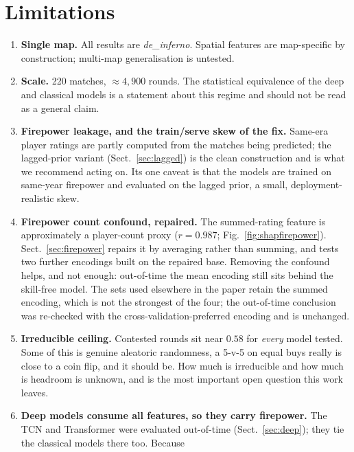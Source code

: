 \documentclass[11pt,a4paper]{article}
\begin{document}
\section{Limitations}
\label{sec:limitations}

\begin{enumerate}
  \item \textbf{Single map.} All results are \textit{de\_inferno}. Spatial features are
    map-specific by construction; multi-map generalisation is untested.
  \item \textbf{Scale.} 220 matches, $\approx 4{,}900$ rounds. The statistical equivalence of the
    deep and classical models is a statement about this regime and should not be read as a general
    claim.
  \item \textbf{Firepower leakage, and the train/serve skew of the fix.} Same-era player ratings are
    partly computed from the matches being predicted; the lagged-prior variant (Sect.~\ref{sec:lagged})
    is the clean construction and is what we recommend acting on. Its one caveat is that the models are
    trained on same-year firepower and evaluated on the lagged prior, a small, deployment-realistic
    skew.
  \item \textbf{Firepower count confound, repaired.} The summed-rating feature is approximately a
    player-count proxy ($r = 0.987$; Fig.~\ref{fig:shapfirepower}). Sect.~\ref{sec:firepower} repairs
    it by averaging rather than summing, and tests two further encodings built on the repaired base.
    Removing the confound helps, and not enough: out-of-time the mean encoding still sits behind the
    skill-free model. The sets used elsewhere in the paper retain the summed encoding, which is not
    the strongest of the four; the out-of-time conclusion was re-checked with the
    cross-validation-preferred encoding and is unchanged.
  \item \textbf{Irreducible ceiling.} Contested rounds sit near $0.58$ for \emph{every} model
    tested. Some of this is genuine aleatoric randomness, a 5-v-5 on equal buys really is close
    to a coin flip, and it should be. How much is irreducible and how much is headroom is unknown,
    and is the most important open question this work leaves.
  \item \textbf{Deep models consume all features, so they carry firepower.} The TCN and Transformer
    were evaluated out-of-time (Sect.~\ref{sec:deep}); they tie the classical models there too. Because

\end{enumerate}
\end{document}
